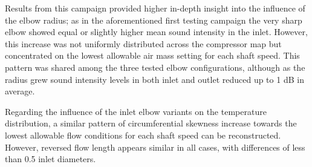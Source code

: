 Results from this campaign provided higher in-depth insight into the influence of the elbow radius; as in the aforementioned first testing campaign the very sharp elbow showed equal or slightly higher mean sound intensity in the inlet. However, this increase was not uniformly distributed across the compressor map but concentrated on the lowest allowable air mass setting for each shaft speed. This pattern was shared among the three tested elbow configurations, although as the radius grew sound intensity levels in both inlet and outlet reduced up to 1 dB in average.

Regarding the influence of the inlet elbow variants on the temperature distribution, a similar pattern of circumferential skewness increase towards the lowest allowable flow conditions for each shaft speed can be reconstructed. However, reversed flow length appears similar in all cases, with differences of less than 0.5 inlet diameters.
